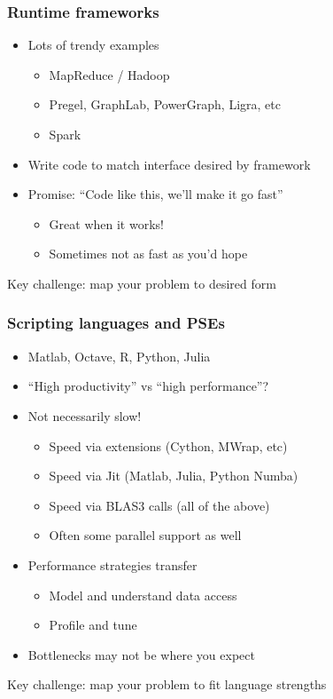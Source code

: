 \documentclass{beamer}
\begin{document}
\begin{frame}
  \frametitle{Runtime frameworks}

  \begin{itemize}
  \item Lots of trendy examples
    \begin{itemize}
    \item MapReduce / Hadoop
    \item Pregel, GraphLab, PowerGraph, Ligra, etc
    \item Spark
    \end{itemize}
  \item Write code to match interface desired by framework
  \item Promise: ``Code like this, we'll make it go fast''
    \begin{itemize}
    \item Great when it works!
    \item Sometimes not as fast as you'd hope
    \end{itemize}
  \end{itemize}
  Key challenge: map your problem to desired form

\end{frame}


\begin{frame}
  \frametitle{Scripting languages and PSEs}

  \begin{itemize}
  \item Matlab, Octave, R, Python, Julia
  \item ``High productivity'' vs ``high performance''?
  \item Not necessarily slow!
    \begin{itemize}
    \item Speed via extensions (Cython, MWrap, etc)
    \item Speed via Jit (Matlab, Julia, Python Numba)
    \item Speed via BLAS3 calls (all of the above)
    \item Often some parallel support as well
    \end{itemize}
  \item Performance strategies transfer
    \begin{itemize}
    \item Model and understand data access
    \item Profile and tune
    \end{itemize}
  \item Bottlenecks may not be where you expect
  \end{itemize}
  Key challenge: map your problem to fit language strengths
\end{frame}
\end{document}
